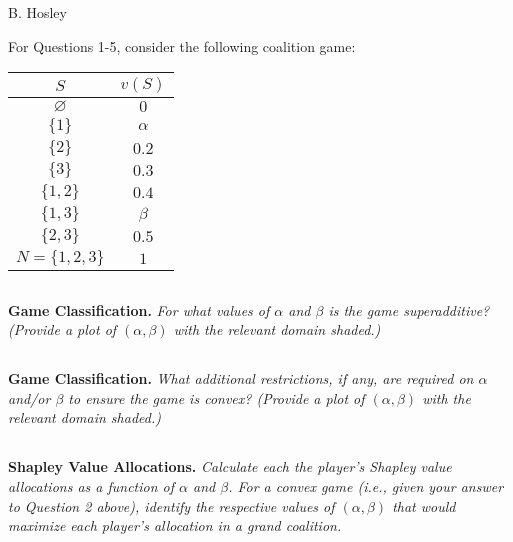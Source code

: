 \documentclass[12pt]{amsart}
\begin{document}
\raggedbottom

\hspace{\fill} {\large B. Hosley}
\bigskip


\setcounter{subsection}{0}
For Questions 1-5, consider the following coalition game:

\begin{center}
	{\renewcommand{\arraystretch}{1.2}
	\begin{tabular}{|c|c|}
		\hline
		\rowcolor[HTML]{C0C0C0} 
		\(S\) 		& \(v(S)\) 	\\ \hline
		$\varnothing$ & $0$ 	\\ \hline
		$\{1\}$ 	& $\alpha$ 	\\ \hline
		$\{2\}$ 	& $0.2$ 	\\ \hline
		$\{3\}$ 	& $0.3$ 	\\ \hline
		$\{1,2\}$ 	& $0.4$ 	\\ \hline
		$\{1,3\}$ 	& $\beta$ 	\\ \hline
		$\{2,3\}$ 	& $0.5$ 	\\ \hline
		$N=\{1,2,3\}$ & $1$ 	\\ \hline
	\end{tabular}}
\end{center}

\subsection{}
\textbf{Game Classification.} 
\textit{For what values of $\alpha$ and $\beta$ is the game superadditive? (Provide a plot of $(\alpha,\beta)$ with the relevant domain shaded.)}

\subsection{}
\textbf{Game Classification.} 
\textit{What additional restrictions, if any, are required on $\alpha$ and/or $\beta$ to ensure the game is convex? (Provide a plot of $(\alpha,\beta)$ with the relevant domain shaded.)}

\subsection{}
\textbf{Shapley Value Allocations.} 
\textit{Calculate each the player’s Shapley value allocations as a function of $\alpha$ and $\beta$. For a convex game (i.e., given your answer to Question 2 above), identify the respective values of $(\alpha,\beta)$ that would maximize each player’s allocation in a grand coalition.}
\end{document}
